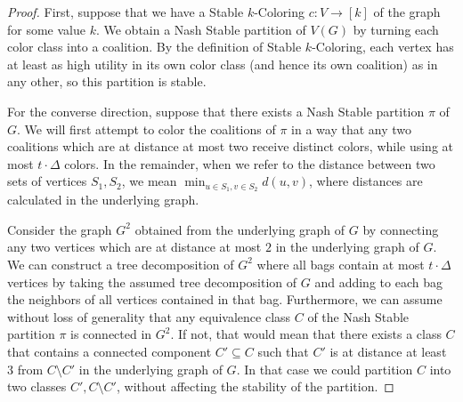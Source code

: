 \documentclass[letterpaper,USenglish,cleveref, autoref, thm-restate]{lipics-v2021}
\begin{document}
\begin{proof} First, suppose that we have a Stable $k$-Coloring $c:V\to [k]$ of
the graph for some value $k$.  We obtain a Nash Stable partition of $V(G)$ by
turning each color class into a coalition. By the definition of Stable
$k$-Coloring, each vertex has at least as high utility in its own color class
(and hence its own coalition) as in any other, so this partition is stable.

%

For the converse direction, suppose that there exists a Nash Stable partition
$\pi$ of $G$. We will first attempt to color the coalitions of $\pi$ in a way
that any two coalitions which are at distance at most two receive distinct
colors, while using at most $t\cdot \Delta$ colors. In the remainder, when we
refer to the distance between two sets of vertices $S_1,S_2$, we mean
$\min_{u\in S_1, v\in S_2}d(u,v)$, where distances are calculated in the
underlying graph.

Consider the graph $G^2$ obtained from the underlying graph of $G$ by
connecting any two vertices which are at distance at most $2$ in the underlying
graph of $G$. We can construct a tree decomposition of $G^2$ where all bags
contain at most $t\cdot \Delta$ vertices by taking the assumed tree
decomposition of $G$ and adding to each bag the neighbors of all vertices
contained in that bag.  Furthermore, we can assume without loss of generality
that any equivalence class $C$ of the Nash Stable partition $\pi$ is connected
in $G^2$.  If not, that would mean that there exists a class $C$ that contains
a connected component $C'\subseteq C$ such that $C'$ is at distance at least
$3$ from $C\setminus C'$ in the underlying graph of $G$. In that case we could
partition $C$ into two classes $C', C\setminus C'$, without affecting the
stability of the partition.


\end{proof}
\end{document}
